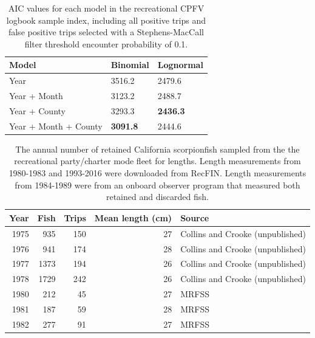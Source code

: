 \documentclass[12pt,]{article}
\begin{document}
\begin{table}[ht]
\centering
\caption{AIC values for each model in the
                                          recreational CPFV logbook sample 
                                          index, including all positive trips 
                                          and false positive trips selected 
                                          with a Stephens-MacCall filter 
                                          threshold encounter probability of 0.1.} 
\label{tab:Fleet5_RecPC_dockside_aic}
\begin{tabular}{lll}
  \hline
Model & Binomial & Lognormal \\ 
  \hline
Year & 3516.2 & 2479.6 \\ 
  Year + Month & 3123.2 & 2488.7 \\ 
  Year + County & 3293.3 & \textbf{2436.3} \\ 
  Year + Month + County & \textbf{3091.8} & 2444.6 \\ 
   \hline
\end{tabular}
\end{table}\begin{table}[ht]
\centering
\caption{The annual number of retained California scorpionfish 
                                              sampled from the the recreational party/charter 
                                              mode fleet for lengths. Length measurements
                                            from 1980-1983 and 1993-2016 were downloaded from RecFIN.  
                                            Length measurements from 1984-1989 were from an onboard
                                            observer program that measured both retained and discarded
                                            fish.} 
\label{tab:Fleet5_lengthsample}
\begin{tabular}{rrrrl}
  \hline
Year & Fish & Trips & Mean length (cm) & Source \\ 
  \hline
1975 & 935 & 150 & 27 & Collins and Crooke (unpublished) \\ 
  1976 & 941 & 174 & 28 & Collins and Crooke (unpublished) \\ 
  1977 & 1373 & 194 & 26 & Collins and Crooke (unpublished) \\ 
  1978 & 1729 & 242 & 26 & Collins and Crooke (unpublished) \\ 
  1980 & 212 & 45 & 27 & MRFSS \\ 
  1981 & 187 & 59 & 28 & MRFSS \\ 
  1982 & 277 & 91 & 27 & MRFSS \\ 

\end{tabular}
\end{table}
\end{document}
